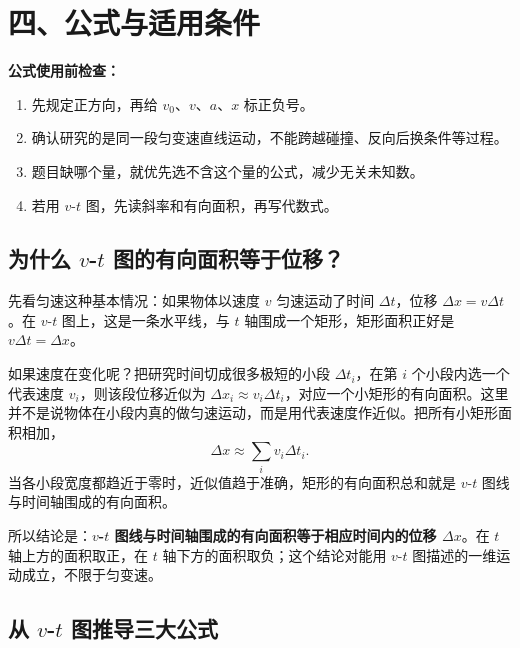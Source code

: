 \section*{四、公式与适用条件}

\textbf{公式使用前检查：}
\begin{enumerate}
  \item 先规定正方向，再给 $v_0$、$v$、$a$、$x$ 标正负号。
  \item 确认研究的是同一段匀变速直线运动，不能跨越碰撞、反向后换条件等过程。
  \item 题目缺哪个量，就优先选不含这个量的公式，减少无关未知数。
  \item 若用 $v$-$t$ 图，先读斜率和有向面积，再写代数式。
\end{enumerate}

\subsection*{为什么 $v$-$t$ 图的有向面积等于位移？}

先看匀速这种基本情况：如果物体以速度 $v$ 匀速运动了时间 $\Delta t$，位移 $\Delta x=v\Delta t$。在 $v$-$t$ 图上，这是一条水平线，与 $t$ 轴围成一个矩形，矩形面积正好是 $v\Delta t=\Delta x$。

如果速度在变化呢？把研究时间切成很多极短的小段 $\Delta t_i$，在第 $i$ 个小段内选一个代表速度 $v_i$，则该段位移近似为 $\Delta x_i\approx v_i\Delta t_i$，对应一个小矩形的有向面积。这里并不是说物体在小段内真的做匀速运动，而是用代表速度作近似。把所有小矩形面积相加，
\[
\Delta x\approx\sum_i v_i\Delta t_i.
\]
当各小段宽度都趋近于零时，近似值趋于准确，矩形的有向面积总和就是 $v$-$t$ 图线与时间轴围成的有向面积。

\begin{center}


\label{fig:vt-area-displacement}
\end{center}

所以结论是：\textbf{$v$-$t$ 图线与时间轴围成的有向面积等于相应时间内的位移 $\Delta x$}。在 $t$ 轴上方的面积取正，在 $t$ 轴下方的面积取负；这个结论对能用 $v$-$t$ 图描述的一维运动成立，不限于匀变速。

\subsection*{从 $v$-$t$ 图推导三大公式}

